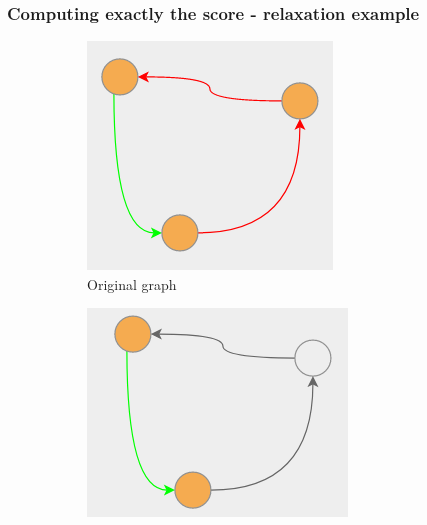 \documentclass{beamer}
\begin{document}
\begin{frame}[c]
	\frametitle{Computing exactly the score - relaxation example}
	\begin{figure}
		\begin{center}
			\begin{subfigure}[b]{0.3\textwidth}
				\centering
				\includegraphics[width=\textwidth]{img/graph-example1-1.png}
				\caption{Original graph}
				\label{fig:img/graph-example1-1.png}
			\end{subfigure}
			\begin{subfigure}[b]{0.3\textwidth}
				\centering
				\includegraphics[width=\textwidth]{img/graph-example1-2.png}

\end{subfigure}
\end{center}
\end{figure}
\end{frame}
\end{document}
